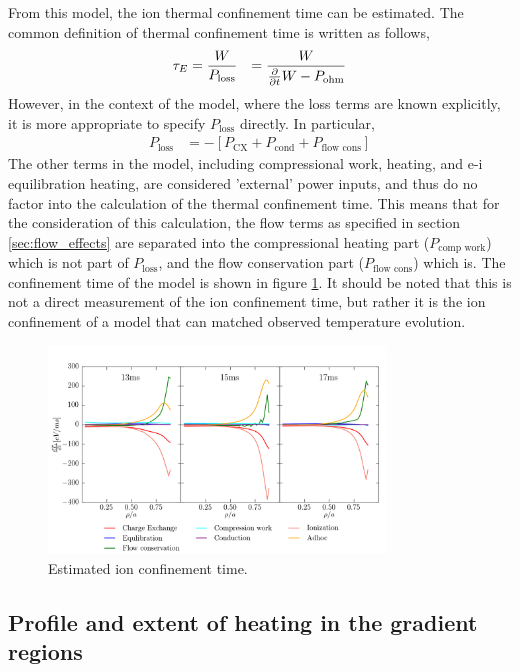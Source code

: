 From this model, the ion thermal confinement time can be estimated. The common definition of thermal confinement time is written as follows,
\begin{align}
    \tau_E &= \frac{W}{P_{\text{loss}}}
    &= \frac{W}{\frac{\partial}{\partial t} W - P_{\text{ohm}}}
\end{align}
However, in the context of the model, where the loss terms are known explicitly, it is more appropriate to specify $P_{\text{loss}}$ directly. In particular, 
\begin{align}
    P_{\text{loss}} &= - [P_{\text{CX}} + P_{\text{cond}} + P_{\text{flow cons}}]
\end{align}
The other terms in the model, including compressional work, \adhoc heating, and e-i equilibration heating, are considered 'external' power inputs, and thus do no factor into the calculation of the thermal confinement time. This means that for the consideration of this calculation, the flow terms as specified in section \ref{sec:flow_effects} are separated into the compressional heating part ($P_{\text{comp work}}$) which is not part of $P_{\text{loss}}$, and the flow conservation part ($P_{\text{flow cons}}$) which is. The confinement time of the model is shown in figure \ref{fig:conf_time}. It should be noted that this is not a direct measurement of the ion confinement time, but rather it is the ion confinement of a model that can matched observed temperature evolution.
\begin{figure}
    \centering
    \includegraphics[width = 0.8\textwidth]{ion_transport_results/dtempdt_with_adhoc.png}
    \caption[Confinement time]{Estimated ion confinement time.}
    \label{fig:conf_time}
\end{figure}



\subsection{Profile and extent of \adhoc heating in the gradient regions}\label{sec:anomalous_heating}

